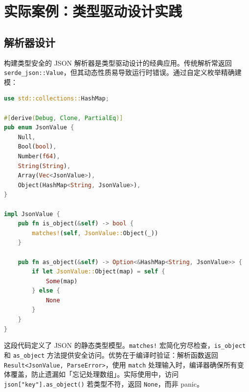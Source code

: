 \chapter{实际案例：类型驱动设计实践}
\section{解析器设计}
构建类型安全的 JSON 解析器是类型驱动设计的经典应用。传统解析常返回 \texttt{serde\_{}json::Value}，但其动态性质易导致运行时错误。通过自定义枚举精确建模：\par
\begin{lstlisting}[language=rust]
use std::collections::HashMap;

#[derive(Debug, Clone, PartialEq)]
pub enum JsonValue {
    Null,
    Bool(bool),
    Number(f64),
    String(String),
    Array(Vec<JsonValue>),
    Object(HashMap<String, JsonValue>),
}

impl JsonValue {
    pub fn is_object(&self) -> bool {
        matches!(self, JsonValue::Object(_))
    }

    pub fn as_object(&self) -> Option<&HashMap<String, JsonValue>> {
        if let JsonValue::Object(map) = self {
            Some(map)
        } else {
            None
        }
    }
}
\end{lstlisting}
这段代码定义了 JSON 的静态类型模型。\texttt{matches!} 宏简化穷尽检查，\texttt{is\_{}object} 和 \texttt{as\_{}object} 方法提供安全访问。优势在于编译时验证：解析函数返回 \texttt{Result<JsonValue, ParseError>}，使用 \texttt{match} 处理输入时，编译器确保所有变体覆盖，防止遗漏如「忘记处理数组」。实际使用中，访问 \texttt{json["key"].as\_{}object()} 若类型不符，返回 \texttt{None}，而非 panic。\par
